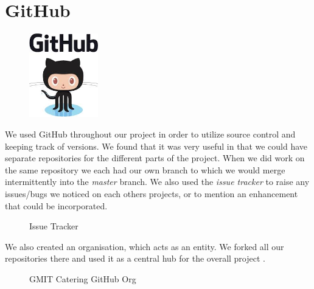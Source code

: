   \section{GitHub}
  \begin{figure}
  	\includegraphics[width=3cm]{img/zf2/github-logo.png}
  \end{figure} 
  We used GitHub \cite{github} throughout our project in order to utilize source control and keeping track of versions.
  We found that it was very useful in that we could have separate repositories for the different parts of the project.
  When we did work on the same repository we each had our own branch to which we would merge intermittently into the \textit{master} branch.
  We also used the \textit{issue tracker} to raise any issues/bugs we noticed on each others projects, or to mention an enhancement that could be incorporated.
  
  \begin{figure}[H] 
  	\caption{Issue Tracker}
  	\label{fig:speciation}
  \end{figure}
  
  
  We also created an organisation, which acts as an entity.
  We forked all our repositories there and used it as a central hub for the overall project \cite{github_org}.
  \begin{figure}[H] 
  	\caption{GMIT Catering GitHub Org}
  	\label{fig:speciation}
  \end{figure}
  
